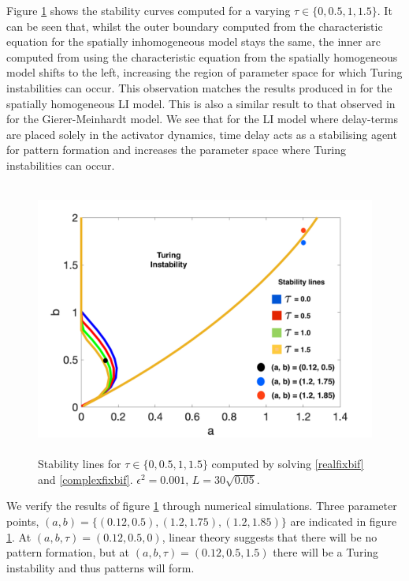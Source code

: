 Figure \ref{fig:tspacetau} shows the stability curves computed for a varying $\tau\in\{0,0.5,1,1.5\}$. It can be seen that, whilst the outer boundary computed from the characteristic equation for the spatially inhomogeneous model stays the same, the inner arc computed from using the characteristic equation from the spatially homogeneous model shifts to the left, increasing the region of parameter space for which Turing instabilities can occur. This observation matches the results produced in \cite{william} for the spatially homogeneous LI model. This is also a similar result to that observed in \cite{fadai2} for the Gierer-Meinhardt model. We see that for the LI model where delay-terms are placed solely in the activator dynamics, time delay acts as a stabilising agent for pattern formation and increases the parameter space where Turing instabilities can occur.
\begin{figure}[H]
        \centering
        \includegraphics[width=12cm,height = 9cm]{tspacetau.png}
        \caption{Stability lines for $\tau\in\{0,0.5,1,1.5\}$ computed by solving \eqref{realfixbif} and \eqref{complexfixbif}. $\epsilon^2=0.001$, $L=30\sqrt{0.05}$.}
        \label{fig:tspacetau}
\end{figure}
We verify the results of figure \ref{fig:tspacetau} through numerical simulations. Three parameter points, $(a,b)=\{(0.12,0.5),(1.2,1.75),(1.2,1.85)\}$ are indicated in figure \ref{fig:tspacetau}. At $(a,b,\tau)=(0.12,0.5,0)$, linear theory suggests that there will be no pattern formation, but at $(a,b,\tau)=(0.12,0.5,1.5)$ there will be a Turing instability and thus patterns will form.
